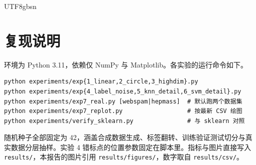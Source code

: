\documentclass{article}
\begin{document}
\begin{CJK}{UTF8}{gbsn}
\section{复现说明}

环境为 Python 3.11，依赖仅 NumPy 与 Matplotlib。各实验的运行命令如下。

{\footnotesize
\begin{minipage}{\linewidth}
\begin{verbatim}
python experiments/exp{1_linear,2_circle,3_highdim}.py
python experiments/exp{4_label_noise,5_knn_detail,6_svm_detail}.py
python experiments/exp7_real.py [webspam|hepmass]  # 默认跑两个数据集
python experiments/exp7_replot.py                  # 按最新 CSV 绘图
python experiments/verify_sklearn.py               # 与 sklearn 对照
\end{verbatim}
\end{minipage}
}

随机种子全部固定为 42，涵盖合成数据生成、标签翻转、训练验证测试切分与真实数据分层抽样。实验 4 错标点的位置参数固定在脚本里。指标与图片直接写入 \texttt{results/}，本报告的图片引用 \texttt{results/figures/}，数字取自 \texttt{results/csv/}。

\end{CJK}
\end{document}
